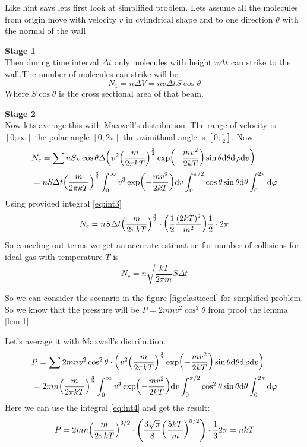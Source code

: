 \documentclass[a4paper, 12pt]{article}
\begin{document}
\begin{sol}
    Like hint says lets first look at simplified problem. Lets assume all the molecules from origin move with velocity $v$ in cylindrical shape and to one direction $\theta$ with the normal of the wall
    
    \textbf{Stage 1}\\
    Then during time interval $\Delta  t$ only molecules with height $v\Delta t$ can strike to the wall.The number of molecules can strike will be
    $$N_1=n\Delta V=nv\Delta tS\cos\theta$$
    Where $S\cos\theta$ is the cross sectional area of that beam.
    
    \textbf{Stage 2}\\
    Now lets average this with Maxwell's distribution. The range of velocity is $[0;\infty]$ the polar angle $[0;2\pi]$ the azimithual angle is $[0;\frac{\pi}{2}]$. Now
    \begin{align*}
        &N_c = \sum nSv\cos\theta\Delta \qty(v^2\qty(\frac{m}{2\pi kT})^{\frac{3}{2}}\exp(-\frac{mv^2}{2kT})\sin\theta\dd\theta\dd\varphi\dd v)\\
        &=nS\Delta t\qty(\frac{m}{2\pi kT})^{\frac{3}{2}}\int_0^\infty v^3\exp(-\frac{mv^2}{2kT})\dd v\int_0^{\pi/2}\cos\theta\sin\theta\dd\theta\int_0^{2\pi}\dd\varphi
    \end{align*}
    Using provided integral \ref{eq:int3}
    $$N_c=nS\Delta t\qty(\frac{m}{2\pi kT})^{\frac{3}{2}}\cdot\qty(\frac12 \frac{(2kT)^2}{m^2})\frac{1}{2}\cdot 2\pi$$
    So canceling out terms we get an accurate estimation for number of collisions for ideal gas with temperature $T$ is
    $$N_c=n\sqrt{\frac{kT}{2\pi m}}S\Delta t$$
\end{sol}
\begin{sol}
    So we can consider the scenario in the figure \ref{fig:elasticcol} for simplified problem.
    So we know that the pressure will be $P=2mnv^2\cos^2\theta$ from proof the lemma \ref{lem:1}.

    Let's average it with Maxwell's distribution.
    \begin{align*}
    &P=\sum 2mnv^2\cos^2\theta\cdot\qty(v^2\qty(\frac{m}{2\pi kT})^{\frac{3}{2}}\exp(-\frac{mv^2}{2kT})\sin\theta\dd\theta\dd\varphi\dd v)\\
    &=2mn\qty(\frac{m}{2\pi kT})^{\frac{3}{2}}\int_0^\infty v^4\exp(-\frac{mv^2}{2kT})\dd v\int_0^{\pi/2}\cos^2\theta\sin\theta\dd\theta\int_0^{2\pi}\dd\varphi
    \end{align*}
    Here we can use the integral \ref{eq:int4} and get the result:
    $$P=2mn\qty(\frac{m}{2\pi kT})^{3/2}\cdot\qty(\frac{3\sqrt{\pi}}{8}\qty(\frac{5kT}{m})^{5/2})\cdot\frac{1}{3}2\pi=nkT$$
\end{sol}
\end{document}
